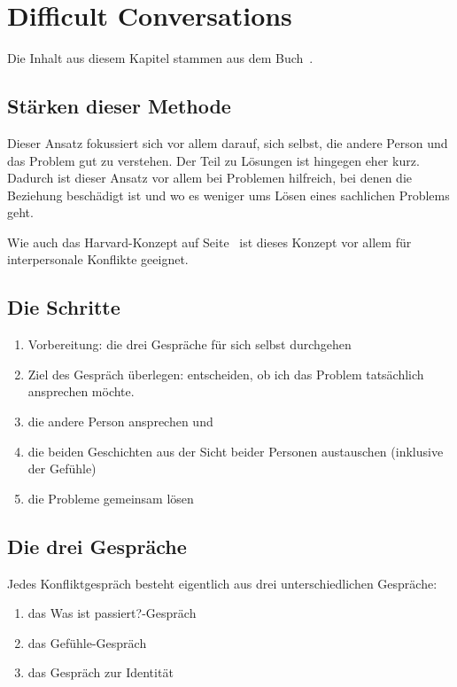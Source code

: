 \section{Difficult Conversations}
\label{difficult-conversations}

Die Inhalt aus diesem Kapitel stammen aus dem Buch~\cite{difficult-conversations}.


\subsection{Stärken dieser Methode}

Dieser Ansatz fokussiert sich vor allem darauf, sich selbst, die andere Person und das Problem gut zu verstehen. Der Teil zu Lösungen ist hingegen eher kurz. Dadurch ist dieser Ansatz vor allem bei Problemen hilfreich, bei denen die Beziehung beschädigt ist und wo es weniger ums Lösen eines sachlichen Problems geht.

Wie auch das Harvard-Konzept auf Seite~\pageref{harvard-konzept} ist dieses Konzept vor allem für interpersonale Konflikte geeignet.


\subsection{Die Schritte}

\begin{enumerate}
  \item Vorbereitung: die drei Gespräche für sich selbst durchgehen
  \item Ziel des Gespräch überlegen: entscheiden, ob ich das Problem tatsächlich ansprechen möchte.
  \item die andere Person ansprechen und 
  \item die beiden Geschichten aus der Sicht beider Personen austauschen (inklusive der Gefühle)
  \item die Probleme gemeinsam lösen
\end{enumerate}


\subsection{Die drei Gespräche}

Jedes Konfliktgespräch besteht eigentlich aus drei unterschiedlichen Gespräche:

\begin{enumerate}
  \item das \glqq Was ist passiert?\grqq-Gespräch
  \item das Gefühle-Gespräch
  \item das Gespräch zur Identität
\end{enumerate}

